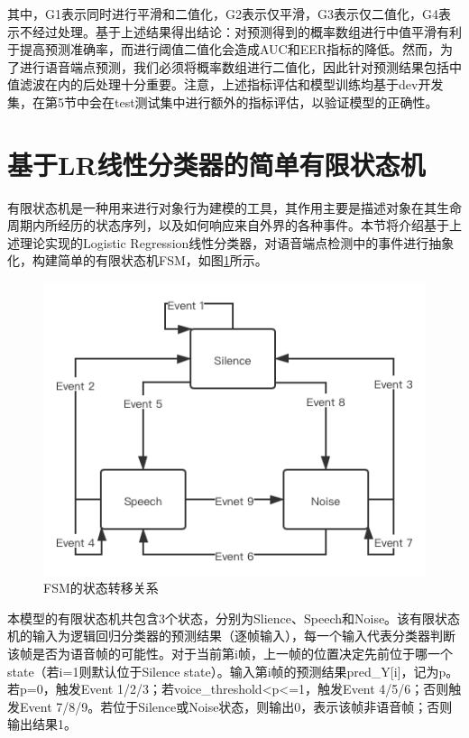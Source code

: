 \documentclass[a4paper]{article}
\begin{document}
其中，G1表示同时进行平滑和二值化，G2表示仅平滑，G3表示仅二值化，G4表示不经过处理。基于上述结果得出结论：对预测得到的概率数组进行中值平滑有利于提高预测准确率，而进行阈值二值化会造成AUC和EER指标的降低。然而，为了进行语音端点预测，我们必须将概率数组进行二值化，因此针对预测结果包括中值滤波在内的后处理十分重要。注意，上述指标评估和模型训练均基于dev开发集，在第5节中会在test测试集中进行额外的指标评估，以验证模型的正确性。

\section{基于LR线性分类器的简单有限状态机}

有限状态机是一种用来进行对象行为建模的工具，其作用主要是描述对象在其生命周期内所经历的状态序列，以及如何响应来自外界的各种事件。本节将介绍基于上述理论实现的Logistic Regression线性分类器，对语音端点检测中的事件进行抽象化，构建简单的有限状态机FSM，如图\ref{fig:3}所示。

\begin{figure}[htb]
  \centering
  \includegraphics[scale=0.5]{figs/FSM.png}
  \caption{FSM的状态转移关系}
  \label{fig:3}
\end{figure} 

本模型的有限状态机共包含3个状态，分别为Slience、Speech和Noise。该有限状态机的输入为逻辑回归分类器的预测结果（逐帧输入），每一个输入代表分类器判断该帧是否为语音帧的可能性。对于当前第i帧，上一帧的位置决定先前位于哪一个state（若i=1则默认位于Silence state）。输入第i帧的预测结果pred\_Y[i]，记为p。若p=0，触发Event 1/2/3；若voice\_threshold<p<=1，触发Event 4/5/6；否则触发Event 7/8/9。若位于Silence或Noise状态，则输出0，表示该帧非语音帧；否则输出结果1。
\end{document}
